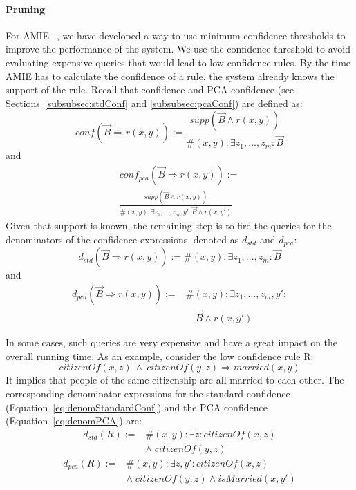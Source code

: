 {\paragraph{Pruning}
For AMIE+, we have developed a way to use minimum confidence thresholds to improve the performance of the system.
We use the confidence threshold to avoid evaluating expensive queries that would lead to low confidence rules.
By the time AMIE has to calculate the confidence of a rule, the system already knows the support of the rule.
Recall that confidence and PCA confidence (see Sections~\ref{subsubsec:stdConf} and \ref{subsubsec:pcaConf}) are defined as:
\[conf(\vec{B} \Rightarrow r(x,y)) := \frac{supp(\vec{B} \wedge r(x,y))}{\#(x,y): \exists z_1,...,z_m: \vec{B}}\]
and
\begin{multline*}
conf_{pca}(\vec{B} \Rightarrow r(x,y)) :=\\
\frac{supp(\vec{B} \wedge r(x,y))}{\#(x,y): \exists z_1,...,z_m,y': \vec{B} \wedge r(x,y')}
\end{multline*}
\noindent Given that support is known, the remaining step is to fire the queries for the denominators of the confidence expressions, denoted as $d_{std}$ and $d_{pca}$:
\begin{equation} \label{eq:denomStandardConf}
 d_{std}(\vec{B} \Rightarrow r(x,y)):= \#(x,y): \exists z_1,...,z_m: \vec{B}
\end{equation}
and
\begin{equation} \label{eq:denomPCA}
\begin{array}{rl}
d_{pca}(\vec{B} \Rightarrow r(x,y)) := {}& \#(x,y): \exists z_1,...,z_m,y': \\ &\quad \vec{B} \wedge r(x,y')
\end{array}
\end{equation}

\noindent In some cases, such queries are very expensive and have a great impact on the overall running time. As an example,
consider the low confidence rule R: \[citizenOf(x,z)\:\wedge\:citizenOf(y,z) \Rightarrow married(x,y)\]
It implies that people of the same citizenship are all married to each other.
The corresponding denominator expressions for the standard confidence (Equation~\ref{eq:denomStandardConf}) and the PCA confidence (Equation~\ref{eq:denomPCA}) are:
\begin{equation*}
\begin{array}{rl}
d_{std}(R) := & \#(x,y): \exists z: citizenOf(x,z)\\ & \wedge\; citizenOf(y,z)
\end{array}
\label{eq:denomStandardCofn}
\end{equation*}
\begin{equation*}
\begin{array}{rl}
d_{pca}(R) := &\#(x,y): \exists z, y': citizenOf(x,z)  \\
  &\wedge\; citizenOf(y,z) \wedge isMarried(x,y') \label{eq:denomPCA}
\end{array}
\end{equation*}

}
